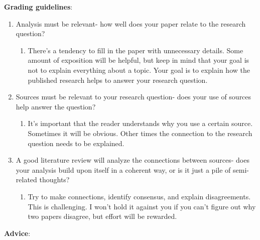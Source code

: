 \documentclass[11pt]{article}
\begin{document}
\noindent
\textbf{Grading guidelines}:

\begin{enumerate}
    \item  Analysis must be relevant- how well does your paper relate to the research question?
    
    \begin{enumerate}
        \item There’s a tendency to fill in the paper with unnecessary details. Some amount of exposition will be helpful, but keep in mind that your goal is not to explain everything about a topic. Your goal is to explain how the published research helps to answer your research question.
    \end{enumerate}
    
    \item  Sources must be relevant to your research question- does your use of sources help answer the question?
    
    \begin{enumerate}
        \item It’s important that the reader understands why you use a certain source. Sometimes it will be obvious. Other times the connection to the research question needs to be explained.
    \end{enumerate}

    \item  A good literature review will analyze the connections between sources- does your analysis
    build upon itself in a coherent way, or is it just a pile of semi-related thoughts?
    
    \begin{enumerate}
        \item Try to make connections, identify consensus, and explain disagreements. This is challenging. I won’t hold it against you if you can’t figure out why two papers disagree, but effort will be rewarded.
    \end{enumerate}
\end{enumerate}


\noindent
\textbf{Advice}:
\end{document}
